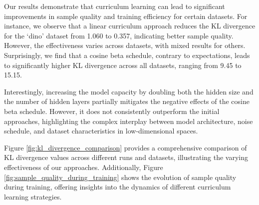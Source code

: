 \documentclass{article} %
\begin{document}
Our results demonstrate that curriculum learning can lead to significant improvements in sample quality and training efficiency for certain datasets. For instance, we observe that a linear curriculum approach reduces the KL divergence for the `dino' dataset from 1.060 to 0.357, indicating better sample quality. However, the effectiveness varies across datasets, with mixed results for others. Surprisingly, we find that a cosine beta schedule, contrary to expectations, leads to significantly higher KL divergence across all datasets, ranging from 9.45 to 15.15.

Interestingly, increasing the model capacity by doubling both the hidden size and the number of hidden layers partially mitigates the negative effects of the cosine beta schedule. However, it does not consistently outperform the initial approaches, highlighting the complex interplay between model architecture, noise schedule, and dataset characteristics in low-dimensional spaces.

Figure \ref{fig:kl_divergence_comparison} provides a comprehensive comparison of KL divergence values across different runs and datasets, illustrating the varying effectiveness of our approaches. Additionally, Figure \ref{fig:sample_quality_during_training} shows the evolution of sample quality during training, offering insights into the dynamics of different curriculum learning strategies.
\end{document}
